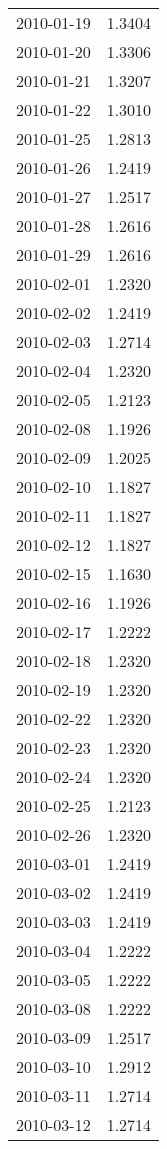 \begin{tabular}{lr}
2010-01-19 &      1.3404 \\
2010-01-20 &      1.3306 \\
2010-01-21 &      1.3207 \\
2010-01-22 &      1.3010 \\
2010-01-25 &      1.2813 \\
2010-01-26 &      1.2419 \\
2010-01-27 &      1.2517 \\
2010-01-28 &      1.2616 \\
2010-01-29 &      1.2616 \\
2010-02-01 &      1.2320 \\
2010-02-02 &      1.2419 \\
2010-02-03 &      1.2714 \\
2010-02-04 &      1.2320 \\
2010-02-05 &      1.2123 \\
2010-02-08 &      1.1926 \\
2010-02-09 &      1.2025 \\
2010-02-10 &      1.1827 \\
2010-02-11 &      1.1827 \\
2010-02-12 &      1.1827 \\
2010-02-15 &      1.1630 \\
2010-02-16 &      1.1926 \\
2010-02-17 &      1.2222 \\
2010-02-18 &      1.2320 \\
2010-02-19 &      1.2320 \\
2010-02-22 &      1.2320 \\
2010-02-23 &      1.2320 \\
2010-02-24 &      1.2320 \\
2010-02-25 &      1.2123 \\
2010-02-26 &      1.2320 \\
2010-03-01 &      1.2419 \\
2010-03-02 &      1.2419 \\
2010-03-03 &      1.2419 \\
2010-03-04 &      1.2222 \\
2010-03-05 &      1.2222 \\
2010-03-08 &      1.2222 \\
2010-03-09 &      1.2517 \\
2010-03-10 &      1.2912 \\
2010-03-11 &      1.2714 \\
2010-03-12 &      1.2714 \\

\end{tabular}
